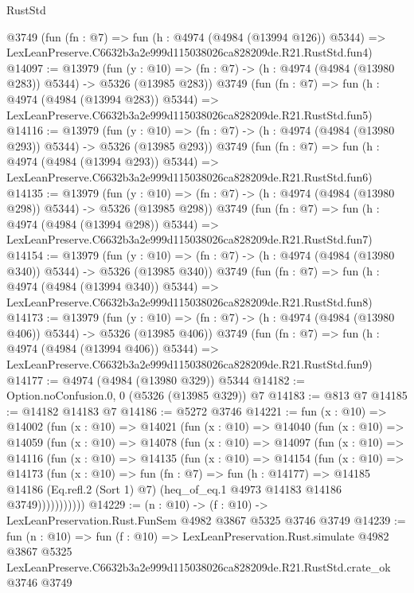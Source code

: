 \begin{lexlean}{RustStd}
\begin{coremodule}
    @3749
    (fun (fn : @7) =>
    fun (h : @4974 (@4984 (@13994 @126)) @5344) =>
    LexLeanPreserve.C6632b3a2e999d115038026ca828209de.R21.RustStd.fun4)
@14097 := @13979
    (fun (y : @10) => (fn : @7) -> (h : @4974 (@4984 (@13980 @283)) @5344) -> @5326 (@13985 @283))
    @3749
    (fun (fn : @7) =>
    fun (h : @4974 (@4984 (@13994 @283)) @5344) =>
    LexLeanPreserve.C6632b3a2e999d115038026ca828209de.R21.RustStd.fun5)
@14116 := @13979
    (fun (y : @10) => (fn : @7) -> (h : @4974 (@4984 (@13980 @293)) @5344) -> @5326 (@13985 @293))
    @3749
    (fun (fn : @7) =>
    fun (h : @4974 (@4984 (@13994 @293)) @5344) =>
    LexLeanPreserve.C6632b3a2e999d115038026ca828209de.R21.RustStd.fun6)
@14135 := @13979
    (fun (y : @10) => (fn : @7) -> (h : @4974 (@4984 (@13980 @298)) @5344) -> @5326 (@13985 @298))
    @3749
    (fun (fn : @7) =>
    fun (h : @4974 (@4984 (@13994 @298)) @5344) =>
    LexLeanPreserve.C6632b3a2e999d115038026ca828209de.R21.RustStd.fun7)
@14154 := @13979
    (fun (y : @10) => (fn : @7) -> (h : @4974 (@4984 (@13980 @340)) @5344) -> @5326 (@13985 @340))
    @3749
    (fun (fn : @7) =>
    fun (h : @4974 (@4984 (@13994 @340)) @5344) =>
    LexLeanPreserve.C6632b3a2e999d115038026ca828209de.R21.RustStd.fun8)
@14173 := @13979
    (fun (y : @10) => (fn : @7) -> (h : @4974 (@4984 (@13980 @406)) @5344) -> @5326 (@13985 @406))
    @3749
    (fun (fn : @7) =>
    fun (h : @4974 (@4984 (@13994 @406)) @5344) =>
    LexLeanPreserve.C6632b3a2e999d115038026ca828209de.R21.RustStd.fun9)
@14177 := @4974 (@4984 (@13980 @329)) @5344
@14182 := Option.noConfusion.{0, 0} (@5326 (@13985 @329)) @7
@14183 := @813 @7
@14185 := @14182 @14183 @7
@14186 := @5272 @3746
@14221 := fun (x : @10) =>
  @14002
    (fun (x : @10) =>
    @14021
      (fun (x : @10) =>
      @14040
        (fun (x : @10) =>
        @14059
          (fun (x : @10) =>
          @14078
            (fun (x : @10) =>
            @14097
              (fun (x : @10) =>
              @14116
                (fun (x : @10) =>
                @14135
                  (fun (x : @10) =>
                  @14154
                    (fun (x : @10) =>
                    @14173
                      (fun (x : @10) =>
                      fun (fn : @7) =>
                      fun (h : @14177) =>
                      @14185
                        @14186
                        (Eq.refl.{2} (Sort 1) @7)
                        (heq_of_eq.{1} @4973 @14183 @14186 @3749)))))))))))
@14229 := (n : @10) -> (f : @10) -> LexLeanPreservation.Rust.FunSem @4982 @3867 @5325 @3746 @3749
@14239 := fun (n : @10) =>
  fun (f : @10) =>
  LexLeanPreservation.Rust.simulate
    @4982
    @3867
    @5325
    LexLeanPreserve.C6632b3a2e999d115038026ca828209de.R21.RustStd.crate_ok
    @3746
    @3749
\end{coremodule}
\end{lexlean}
